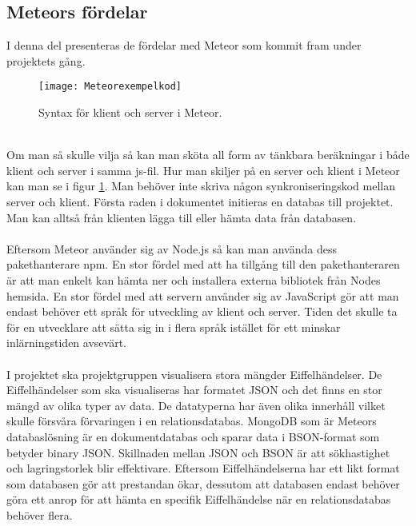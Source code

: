 \subsection{Meteors fördelar}
I denna del presenteras de fördelar med Meteor som kommit fram under projektets gång.
\label{subsec:johan_t-meteor_fördelar}
\begin{figure}[h]
    \centering
    \texttt{[image: Meteorexempelkod]}
    \caption{Syntax för klient och server i Meteor.}
    \label{fig:meteor_syntax}
\end{figure}
\\
Om man så skulle vilja så kan man sköta all form av tänkbara beräkningar i både klient och server i samma js-fil. Hur man skiljer på en server och klient i Meteor kan man se i figur \ref{fig:meteor_syntax}. Man behöver inte skriva någon synkroniseringskod mellan server och klient. Första raden i dokumentet initieras en databas till projektet. Man kan alltså från klienten lägga till eller hämta data från databasen.
\\ \\
Eftersom Meteor använder sig av Node.js så kan man använda dess pakethanterare npm. En stor fördel med att ha tillgång till den pakethanteraren är att man enkelt kan hämta ner och installera externa bibliotek från Nodes hemsida. En stor fördel med att servern använder sig av JavaScript gör att man endast behöver ett språk för utveckling av klient och server. Tiden det skulle ta för en utvecklare att sätta sig in i flera språk istället för ett minskar inlärningstiden avsevärt.
\\ \\
I  projektet ska projektgruppen visualisera stora mängder Eiffelhändelser. De Eiffelhändelser som ska visualiseras har formatet JSON och det finns en stor mängd av olika typer av data. De datatyperna har även olika innerhåll vilket skulle försvåra förvaringen i en relationsdatabas. MongoDB som är Meteors databaslösning är en dokumentdatabas och sparar data i  BSON-format som betyder binary JSON. Skillnaden mellan JSON och BSON är att sökhastighet och lagringstorlek blir effektivare. Eftersom Eiffelhändelserna har ett likt format som databasen gör att prestandan ökar, dessutom att databasen endast behöver göra ett anrop för att hämta en specifik Eiffelhändelse när en relationsdatabas behöver flera. 
